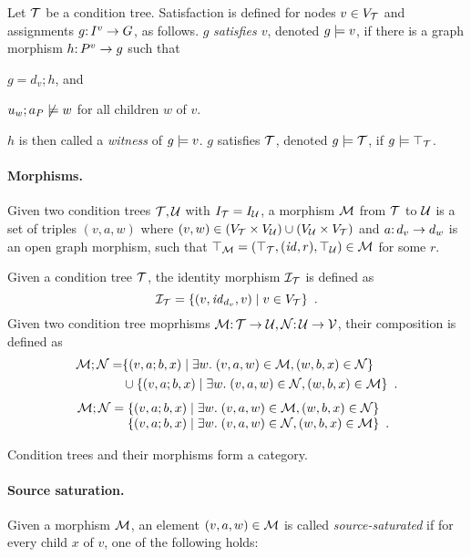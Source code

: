 Let ${\mathcal{T}}$ be a condition tree. Satisfaction is defined for nodes $v\in V_{\mathcal{T}}$ and assignments $g{:}\, I^v\rightarrow G$, as follows. $g$ \emph{satisfies $v$}, denoted $g\models v$, if there is a graph morphism $h{:}\, P^v\rightarrow g$ such that
\begin{inumerate}
\item $g=d_v;h$, and 
\item $u_w;a_P\not\models w$ for all children $w$ of $v$.
\end{inumerate}
$h$ is then called a \emph{witness} of $g\models v$.
$g$ satisfies ${\mathcal{T}}$, denoted $g\models{\mathcal{T}}$, if $g\models\top_{{\mathcal{T}}}$.

\paragraph{Morphisms.}

Given two condition trees ${\mathcal{T}},{\mathcal{U}}$ with $I_{\mathcal{T}}=I_{\mathcal{U}}$, a morphism ${\mathcal{M}}$ from ${\mathcal{T}}$ to ${\mathcal{U}}$ is a set of triples $(v,a,w)$ where $(v,w)\in (V_{\mathcal{T}}\times V_{\mathcal{U}})\cup (V_{\mathcal{U}}\times V_{\mathcal{T}})$ and $a{:}\, d_v\rightarrow d_w$ is an open graph morphism, such that $\top_{{\mathcal{M}}}=(\top_{{\mathcal{T}}},({\mathit{id}},r),\top_{{\mathcal{U}}})\in {\mathcal{M}}$ for some $r$.

Given a condition tree ${\mathcal{T}}$, the identity morphism ${\mathcal{I}}_{\mathcal{T}}$ is defined as
\[ {\mathcal{I}}_{\mathcal{T}} = \{{(v,{\mathit{id}}_{d_v},v)\mid v\in V_{\mathcal{T}}}\} \enspace. \]
Given two condition tree moprhisms ${\mathcal{M}}{:}\, {\mathcal{T}}\rightarrow {\mathcal{U}},{\mathcal{N}}{:}\, {\mathcal{U}}\rightarrow {\mathcal{V}}$, their composition is defined as
\begin{align*}
{\mathcal{M}};{\mathcal{N}} = 
  & \{{(v,a;b,x) \mid \exists w.\; (v,a,w)\in {\mathcal{M}}, (w,b,x)\in {\mathcal{N}}}\} \\
  & \cup \{{(v,a;b,x) \mid \exists w.\; (v,a,w)\in {\mathcal{N}}, (w,b,x)\in {\mathcal{M}}}\} \enspace.
\end{align*}
\[ \cM;\cN =
\begin{array}[t]{@{}l}
	\setof{(v,a;b,x) \mid \exists w\st (v,a,w)\in \cM, (w,b,x)\in \cN} \\
	\setof{(v,a;b,x) \mid \exists w\st (v,a,w)\in \cN, (w,b,x)\in \cM} \enspace.
\end{array}
\]

\begin{proposition}
Condition trees and their morphisms form a category.
\end{proposition}

\paragraph{Source saturation.}

Given a morphism ${\mathcal{M}}$, an element $(v,a,w)\in {\mathcal{M}}$ is called \emph{source-saturated} if for every child $x$ of $v$, one of the following holds:

